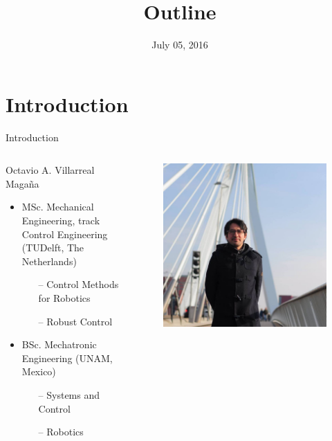 \documentclass{beamer}
\title{Outline}
\date{July 05, 2016}
\begin{document}

\section{Introduction}

\begin{frame}{Introduction}
	\begin{columns}
		\begin{column}{0.6\textwidth}
		Octavio A. Villarreal Maga\~na
		\\
			\begin{itemize}\setlength\itemsep{2.5em}
				\item MSc. Mechanical Engineering, track Control Engineering (TUDelft, The Netherlands)
				\begin{itemize}\setlength\itemsep{1em}
					\item [--] Control Methods for Robotics
					\item [--] Robust Control
				\end{itemize}
				\item BSc. Mechatronic Engineering (UNAM, Mexico)
				\begin{itemize}\setlength\itemsep{1em}
					\item [--] Systems and Control
					\item [--] Robotics
				\end{itemize}
			\end{itemize}
		\end{column}
		\begin{column}{0.4\textwidth}
			\begin{figure}[ht]
				\vspace{-30pt}
				\includegraphics[width=1.5\textwidth]{images/yo.jpg}

\end{figure}
\end{column}
\end{columns}
\end{frame}
\end{document}

